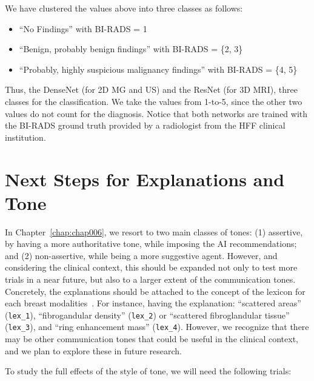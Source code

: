 \vspace{1.15mm}

\noindent
We have clustered the values above into three classes as follows:

\vspace{0.05mm}

\begin{itemize}
\item ``No Findings'' with \ac{BI-RADS} = 1
\item ``Benign, probably benign findings'' with \ac{BI-RADS} = \{2, 3\}
\item ``Probably, highly suspicious malignancy findings'' with \ac{BI-RADS} = \{4, 5\}
\end{itemize}

Thus, the  DenseNet (for 2D \ac{MG} and \ac{US}) and the ResNet (for 3D \ac{MRI}), three classes for the classification.
We take the values from 1-to-5, since the other two values do not count for the diagnosis.
Notice that both networks are trained with the \ac{BI-RADS} ground truth provided by a radiologist from the \ac{HFF} clinical institution.

\section{Next Steps for Explanations and Tone}
\label{sec:app001007}

In Chapter~\ref{chap:chap006}, we resort to two main classes of tones:
(1) assertive, by having a more authoritative tone, while imposing the \ac{AI} recommendations; and
(2) non-assertive, while being a more suggestive agent.
However, and considering the clinical context, this should be expanded not only to test more trials in a near future, but also to a larger extent of the communication tones.
Concretely, the explanations should be attached to the concept of the lexicon for each breast modalities~\cite{SPAK2017179}.
For instance, having the explanation: ``scattered areas'' (\texttt{lex\_1}), ``fibrogandular density'' (\texttt{lex\_2})  or ``scattered fibroglandular tissue'' (\texttt{lex\_3}), and ``ring enhancement mass'' (\texttt{lex\_4}).
However, we recognize that there may be other communication tones that could be useful in the clinical context, and we plan to explore these in future research.

\vspace{1.5mm}

\noindent
To study the full effects of the style of tone, we will need the following trials:

